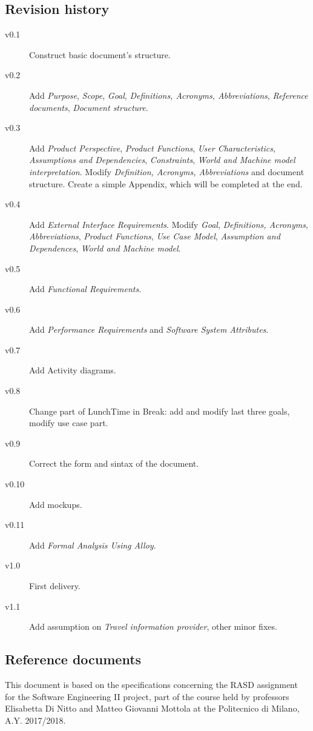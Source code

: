 \documentclass{article}
\begin{document}
	
	\subsection{Revision history}
	\begin{description}
		\item[v0.1] Construct basic document's structure.
		\item[v0.2] Add \textit{Purpose}, \textit{Scope}, \textit{Goal}, \textit{Definitions, Acronyms, Abbreviations}, \textit{Reference documents}, \textit{Document structure}.
		\item[v0.3] Add \textit{Product Perspective}, \textit{Product Functions}, \textit{User Characteristics}, \textit{Assumptions and Dependencies}, \textit{Constraints}, \textit{World and Machine model interpretation}. Modify \textit{Definition, Acronyms, Abbreviations} and document structure. Create a simple Appendix, which will be completed at the end.
		\item[v0.4] Add \textit{External Interface Requirements}. Modify \textit{Goal}, \textit{Definitions, Acronyms, Abbreviations}, \textit{Product Functions}, \textit{Use Case Model}, \textit{Assumption and Dependences}, \textit{World and Machine model}.
		\item[v0.5] Add \textit{Functional Requirements}.
		\item[v0.6] Add \textit{Performance Requirements} and \textit{Software System Attributes}.
		\item[v0.7] Add Activity diagrams.
		\item[v0.8] Change part of LunchTime in Break: add and modify last three goals, modify use case part.
		\item[v0.9] Correct the form and sintax of the document.
		\item[v0.10] Add mockups.
		\item[v0.11] Add \textit{Formal Analysis Using Alloy}.
		\item[v1.0] First delivery.
		\item[v1.1] Add assumption on \textit{Travel information provider}, other minor fixes.
	\end{description}
	
	
	\subsection{Reference documents}
	This document is based on the specifications concerning the RASD assignment for the Software Engineering II project, part of the course held by professors Elisabetta Di Nitto and Matteo Giovanni Mottola at the Politecnico di Milano, A.Y. 2017/2018.
	
\end{document}
